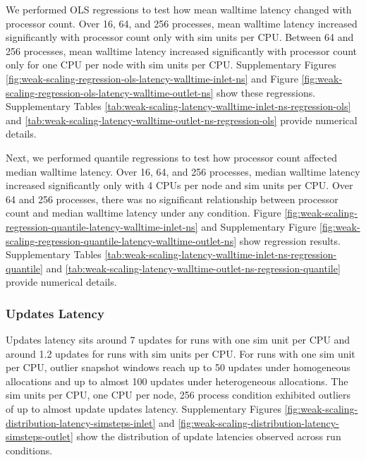 We performed OLS regressions to test how mean walltime latency changed with processor count.
Over 16, 64, and 256 processes, mean walltime latency increased significantly with processor count only with  sim units per CPU.
Between 64 and 256 processes, mean walltime latency increased significantly with processor count only for one CPU per node with  sim units per CPU.
Supplementary Figures \ref{fig:weak-scaling-regression-ols-latency-walltime-inlet-ns} and Figure \ref{fig:weak-scaling-regression-ols-latency-walltime-outlet-ns} show these regressions.
Supplementary Tables \ref{tab:weak-scaling-latency-walltime-inlet-ns-regression-ols} and \ref{tab:weak-scaling-latency-walltime-outlet-ns-regression-ols} provide numerical details.



Next, we performed quantile regressions to test how processor count affected median walltime latency.
Over 16, 64, and 256 processes, median walltime latency increased significantly only with 4 CPUs per node and  sim units per CPU.
Over 64 and 256 processes, there was no significant relationship between processor count and median walltime latency under any condition.
Figure \ref{fig:weak-scaling-regression-quantile-latency-walltime-inlet-ns} and Supplementary Figure \ref{fig:weak-scaling-regression-quantile-latency-walltime-outlet-ns} show regression results.
Supplementary Tables \ref{tab:weak-scaling-latency-walltime-inlet-ns-regression-quantile} and \ref{tab:weak-scaling-latency-walltime-outlet-ns-regression-quantile} provide numerical details.

\subsubsection{Updates Latency}

Updates latency sits around 7 updates for runs with one sim unit per CPU and around 1.2 updates for runs with  sim units per CPU.
For runs with one sim unit per CPU, outlier snapshot windows reach up to 50 updates under homogeneous allocations and up to almost 100 updates under heterogeneous allocations.
The  sim units per CPU, one CPU per node, 256 process condition exhibited outliers of up to almost  update updates latency.
Supplementary Figures \ref{fig:weak-scaling-distribution-latency-simsteps-inlet} and \ref{fig:weak-scaling-distribution-latency-simsteps-outlet}  show the distribution of update latencies observed across run conditions.

